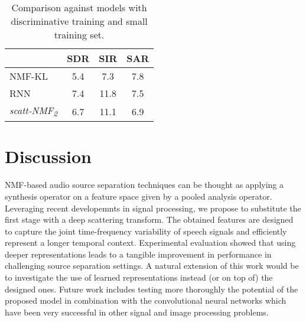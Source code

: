 \begin{table}[tb]
\caption{Comparison against models with discriminative training 
and small training set. \label{ta:eval2}}
\vspace{-4.5ex}
\begin{center}
\footnotesize{
\begin{tabular}{l|c|c|c}
  \hline\hline
& SDR & SIR & SAR \\
\hline
NMF-KL     & 5.4 &   7.3 & 7.8 \\
\hline
RNN \cite{Huang_DNN_Separation_ICASSP2014} & 7.4  &   11.8 & 7.5  \\
\hline
\emph{scatt-NMF\textsubscript{2}} &  6.7 & 11.1  & 6.9 \\
  \hline\hline
\end{tabular}
}
\end{center}
\vspace{-4.0ex}
\end{table}


\section{Discussion}
NMF-based audio source separation techniques can be thought as applying a synthesis operator on a feature space
given by a pooled analysis operator. Leveraging recent developemnts in signal processing, we propose to substitute
the first stage with a deep scattering transform. 
The obtained features are designed to capture the joint time-frequency variability of speech signals
and efficiently represent a longer temporal context. Experimental evaluation showed that using deeper representations
leads to a tangible improvement in performance in challenging source separation settings.
A natural extension of this work would be to investigate the use of learned representations instead (or on top of)
the designed ones.
%
Future work includes testing more thoroughly the potential of the proposed model in combination
with the convolutional neural networks which have been very successful in other signal and image processing problems.

